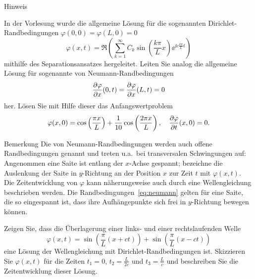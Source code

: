 \documentclass{scrartcl}
\begin{document}
\begin{subex}
\begin{remark}{Hinweis}
  \end{remark}


  \item{} In der Vorlesung wurde die allgemeine Lösung für die sogenannten Dirichlet-Randbedingungen $\varphi(0, 0) = \varphi(L, 0) = 0$ 
  \[
    \varphi(x, t) = \Re \left( \sum_{k=1}^\infty C_k \sin \left( \frac{k\pi}{L} x \right) \ee^{\ii c \frac{k\pi}{L} t} \right)
  \]
  mithilfe des Separationsansatzes hergeleitet.
  Leiten Sie analog die allgemeine Lösung für sogenannte von Neumann-Randbedingungen 
  \[
    \pderiv[\varphi]{x}(0, t) = \pderiv[\varphi]{x}(L, t) = 0
    \label{eq:neumann}
  \]
  her.
  Lösen Sie mit Hilfe dieser das Anfangswertproblem
  \[
    \varphi(x, 0) = \cos\left(\frac{\pi x}{L}\right) + \frac{1}{10} \cos\left( \frac{2\pi x}{L} \right), \quad
    \pderiv[\varphi]{t}(x, 0) = 0.
  \]
  \begin{remark}{Bemerkung}
    Die von Neumann-Randbedingungen werden auch offene Randbedingungen genannt und treten u.a.\ bei transversalen Schwingungen auf:
    Angenommen eine Saite ist entlang der $x$-Achse gespannt; bezeichne die Auslenkung der Saite in $y$-Richtung an der Position $x$ zur Zeit $t$ mit $\varphi(x, t)$.
    Die Zeitentwicklung von $\varphi$ kann näherungsweise auch durch eine Wellengleichung beschrieben werden.
    Die Randbedingungen~\eqref{eq:neumann} gelten für eine Saite, die so eingespannt ist, dass ihre Aufhängepunkte sich frei in $y$-Richtung bewegen können.
  \end{remark}


  \item{} Zeigen Sie, dass die Überlagerung einer links- und einer rechtslaufenden Welle
  \[
    \varphi(x, t) = \sin\left( \frac{\pi}{L} (x + ct) \right) + \sin\left( \frac{\pi}{L} (x - ct) \right)
  \]
  eine Lösung der Wellengleichung mit Dirichlet-Randbedingungen ist.
  Skizzieren Sie $\varphi(x, t)$ für die Zeiten $t_1 = 0$, $t_2 = \frac{L}{2c}$ und $t_3 = \frac{L}{c}$ und beschreiben Sie die Zeitentwicklung dieser Lösung.
\end{subex}
\end{document}
